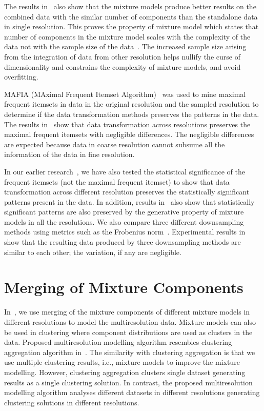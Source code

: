 The results in~ also show that the mixture models 
produce better results on the combined data with the similar
number of components than the standalone data in single 
resolution. This proves the property of mixture model which 
states that number of components in the mixture model scales
with the complexity of the data not with the sample size of 
the data~\cite{hammoud2000}. The increased sample size 
arising from the integration of data from other resolution 
helps nullify the curse of dimensionality and
constrains the complexity of mixture models, and avoid 
overfitting.


MAFIA (MAximal Frequent Itemset Algorithm)~\cite{burdick01} was
used to mine maximal frequent itemsets in data in the original 
resolution and the sampled resolution to determine if the data 
transformation methods preserves the patterns in the data. The 
results in~ show that data transformation across 
resolutions preserves the maximal frequent itemsets with 
negligible differences. The negligible differences are expected 
because data in coarse resolution cannot subsume all the 
information of the data in fine resolution. 

In our earlier 
research~\cite{adhikari2010b}, we have also tested the 
statistical significance  of the frequent itemsets (not the
maximal frequent itemset) to show that data transformation 
across different resolution preserves
the statistically significant patterns present in the data.
In addition, results in~\cite{adhikari2010b} also show
that statistically significant patterns are also preserved
by the generative property of mixture models in all the 
resolutions.  We also compare three different downsampling methods 
using metrics such as the Frobenius norm~\cite{stewart1998}.
Experimental results in~ show that the resulting
data produced by three downsampling methods are similar 
to each other; the variation, if any are negligible.


\section{Merging of Mixture Components}
\label{s:meringMixCompo}
In~, we use merging of the mixture components of  
different mixture models in different resolutions to model the 
multiresolution data.  Mixture models can also be used in clustering 
where component distributions are used as clusters in the data.
Proposed multiresolution modelling algorithm resembles clustering
aggregation algorithm in~\cite{gionis07ca}. The similarity with 
clustering aggregation is that we use multiple clustering results,
i.e., mixture models to improve the mixture modelling. However, 
clustering aggregation clusters single dataset generating results
as a single clustering solution. In contrast, the proposed multiresolution
modelling algorithm analyses different datasets in different 
resolutions generating clustering solutions in 
different resolutions. 


